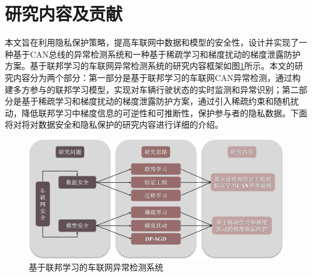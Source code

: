 
\section{研究内容及贡献}

本文旨在利用隐私保护策略，提高车联网中数据和模型的安全性，设计并实现了一种基于CAN总线的异常检测系统和一种基于稀疏学习和梯度扰动的梯度泄露防护方案。基于联邦学习的车联网异常检测系统的研究内容框架如图\ref{fig:Anomaly_detection_system_of_IoVFL}所示。本文的研究内容分为两个部分：第一部分是基于联邦学习的车联网CAN异常检测，通过构建多方参与的联邦学习模型，实现对车辆行驶状态的实时监测和异常识别；第二部分是基于稀疏学习和梯度扰动的梯度泄露防护方案，通过引入稀疏约束和随机扰动，降低联邦学习中梯度信息的可逆性和可推断性，保护参与者的隐私数据。下面将对将对数据安全和隐私保护的研究内容进行详细的介绍。

\begin{figure}[htb]
    \centering
    \includegraphics[width=1 \textwidth]{figures/chapter1/chapter1.2.png}
    \caption{基于联邦学习的车联网异常检测系统}
    \label{fig:Anomaly_detection_system_of_IoVFL}
\end{figure}

